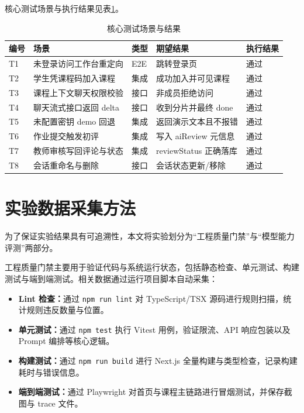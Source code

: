 \documentclass[12pt,a4paper,oneside]{ctexbook}
\numberwithin{equation}{chapter}
\begin{document}
核心测试场景与执行结果见表\ref{tab:testCases}。

\begin{table}[H]
  \centering
  \caption{核心测试场景与结果}
  \label{tab:testCases}
  \begin{tabular}{p{0.9cm}p{5.2cm}p{1.2cm}p{4.5cm}p{2.0cm}}
    \toprule
    编号 & 场景 & 类型 & 期望结果 & 执行结果 \\
    \midrule
    T1 & 未登录访问工作台重定向 & E2E & 跳转登录页 & 通过 \\
    T2 & 学生凭课程码加入课程 & 集成 & 成功加入并可见课程 & 通过 \\
    T3 & 课程上下文聊天权限校验 & 接口 & 非成员拒绝访问 & 通过 \\
    T4 & 聊天流式接口返回 delta & 接口 & 收到分片并最终 done & 通过 \\
    T5 & 未配置密钥 demo 回退 & 集成 & 返回演示文本且不报错 & 通过 \\
    T6 & 作业提交触发初评 & 集成 & 写入 aiReview 元信息 & 通过 \\
    T7 & 教师审核写回评论与状态 & 集成 & reviewStatus 正确落库 & 通过 \\
    T8 & 会话重命名与删除 & 接口 & 会话状态更新/移除 & 通过 \\
    \bottomrule
  \end{tabular}
\end{table}

\section{实验数据采集方法}

为了保证实验结果具有可追溯性，本文将实验划分为“工程质量门禁”与“模型能力评测”两部分。

工程质量门禁主要用于验证代码与系统运行状态，包括静态检查、单元测试、构建测试与端到端测试。相关数据通过运行项目脚本自动采集：

\begin{itemize}
  \item \textbf{Lint 检查：}通过 \texttt{npm run lint} 对 TypeScript/TSX 源码进行规则扫描，统计规则违反数量与位置。
  
  \item \textbf{单元测试：}通过 \texttt{npm test} 执行 Vitest 用例，验证限流、API 响应包装以及 Prompt 编排等核心逻辑。
  
  \item \textbf{构建测试：}通过 \texttt{npm run build} 进行 Next.js 全量构建与类型检查，记录构建耗时与错误信息。
  
  \item \textbf{端到端测试：}通过 Playwright 对首页与课程主链路进行冒烟测试，并保存截图与 trace 文件。
\end{itemize}
\end{document}
